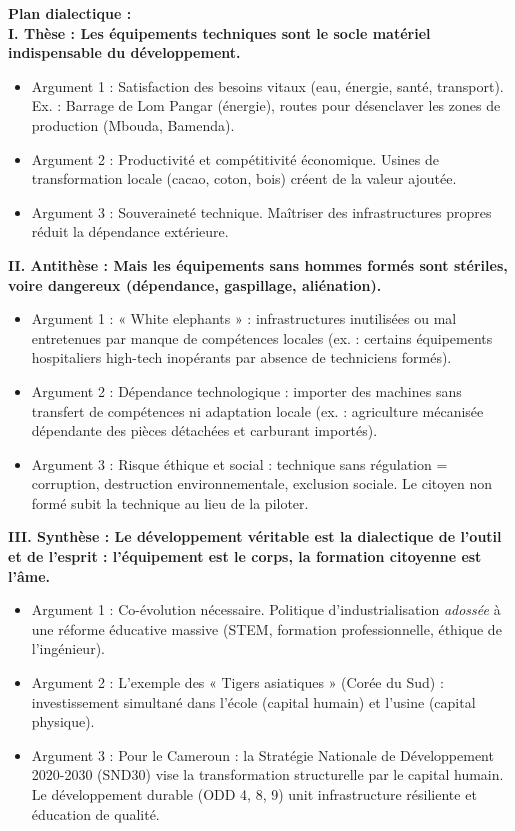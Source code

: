 \documentclass[11pt]{article}
\newcommand{\cle}[1]{{\popxbold\color{popdark}#1}}
\begin{document}
\begin{exoresolu}
\textbf{Plan dialectique :}\\
\textbf{I. Thèse : Les équipements techniques sont le socle matériel indispensable du développement.}\\
\begin{itemize}
\item Argument 1 : Satisfaction des besoins vitaux (eau, énergie, santé, transport). Ex. : Barrage de Lom Pangar (énergie), routes pour désenclaver les zones de production (Mbouda, Bamenda).
\item Argument 2 : Productivité et compétitivité économique. Usines de transformation locale (cacao, coton, bois) créent de la valeur ajoutée.
\item Argument 3 : Souveraineté technique. Maîtriser des infrastructures propres réduit la dépendance extérieure.
\end{itemize}
\textbf{II. Antithèse : Mais les équipements sans hommes formés sont stériles, voire dangereux (dépendance, gaspillage, aliénation).}\\
\begin{itemize}
\item Argument 1 : « White elephants » : infrastructures inutilisées ou mal entretenues par manque de compétences locales (ex. : certains équipements hospitaliers high-tech inopérants par absence de techniciens formés).
\item Argument 2 : Dépendance technologique : importer des machines sans transfert de compétences ni adaptation locale (ex. : agriculture mécanisée dépendante des pièces détachées et carburant importés).
\item Argument 3 : Risque éthique et social : technique sans régulation = corruption, destruction environnementale, exclusion sociale. Le citoyen non formé subit la technique au lieu de la piloter.
\end{itemize}
\textbf{III. Synthèse : Le développement véritable est la dialectique de l'outil et de l'esprit : l'équipement est le corps, la formation citoyenne est l'âme.}\\
\begin{itemize}
\item Argument 1 : Co-évolution nécessaire. Politique d'industrialisation \emph{adossée} à une réforme éducative massive (STEM, formation professionnelle, éthique de l'ingénieur).
\item Argument 2 : L'exemple des « Tigers asiatiques » (Corée du Sud) : investissement simultané dans l'école (capital humain) et l'usine (capital physique).
\item Argument 3 : Pour le Cameroun : la \cle{Stratégie Nationale de Développement 2020-2030 (SND30)} vise la transformation structurelle par le capital humain. Le développement durable (ODD 4, 8, 9) unit infrastructure résiliente et éducation de qualité.

\end{itemize}
\end{exoresolu}
\end{document}

